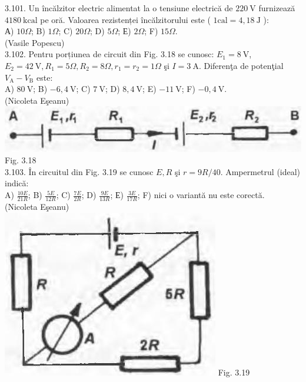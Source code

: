\documentclass[10pt]{article}
\begin{document}
3.101. Un încălzitor electric alimentat la o tensiune electrică de $220 \mathrm{~V}$ furnizează $4180 \mathrm{~kcal}$ pe oră. Valoarea rezistenței încălzitorului este ( $1 \mathrm{cal}=4,18 \mathrm{~J}$ ):\\ А) $10 \Omega$; B) $1 \Omega$; C) $20 \Omega$; D) $5 \Omega$; Е) $2 \Omega$; F) $15 \Omega$.\\ (Vasile Popescu)\\

3.102. Pentru porțiunea de circuit din Fig. 3.18 se cunosc: $E_{1}=8 \mathrm{~V}$, $E_{2}=42 \mathrm{~V}, R_{1}=5 \Omega, R_{2}=8 \Omega, r_{1}=r_{2}=1 \Omega$ şi $I=3 \mathrm{~A}$. Diferenţa de potenţial $V_{\mathrm{A}}-V_{\mathrm{B}}$ este:\\ A) $80 \mathrm{~V}$; B) $-6,4 \mathrm{~V}$; C) $7 \mathrm{~V}$; D) $8,4 \mathrm{~V}$; E) $-11 \mathrm{~V}$; F) $-0,4 \mathrm{~V}$.\\ (Nicoleta Eşeanu)\\ \includegraphics[max width=\textwidth, center]{2025_07_01_5b3ff9fa0d508c8e9f17g-166} Fig. 3.18\\

3.103. În circuitul din Fig. 3.19 se cunosc $E, R$ şi $r=9 R / 40$. Ampermetrul (ideal) indică:\\ A) $\frac{10 E}{21 R}$; B) $\frac{5 E}{12 R}$; C) $\frac{7 E}{2 R}$; D) $\frac{9 E}{13 R}$; Е) $\frac{3 E}{17 R}$; F) nici o variantă nu este corectă.\\ (Nicoleta Eşeanu)\\ \includegraphics[max width=\textwidth, center]{2025_07_01_5b3ff9fa0d508c8e9f17g-166(1)} Fig. 3.19\\
\end{document}
